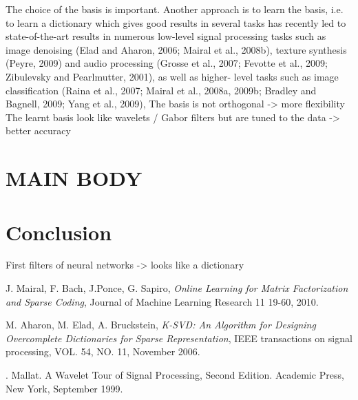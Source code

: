 \documentclass[a4paper,11pt]{article}
\begin{document}
The choice of the basis is important.
Another approach is to learn the basis, i.e. to learn a dictionary which gives good results in several tasks has
recently led to state-of-the-art
results in numerous low-level signal processing tasks such as image denoising (Elad and Aharon,
2006; Mairal et al., 2008b), texture synthesis (Peyre, 2009) and audio processing (Grosse et al.,
2007; Fevotte et al., 2009; Zibulevsky and Pearlmutter, 2001), as well as higher- level tasks such as
image classification (Raina et al., 2007; Mairal et al., 2008a, 2009b; Bradley and Bagnell, 2009;
Yang et al., 2009),
The basis is not orthogonal -> more flexibility
The learnt basis look like wavelets / Gabor filters but are tuned to the data -> better accuracy

\section{MAIN BODY}

\section{Conclusion}
First filters of neural networks -> looks like a dictionary



\begin{thebibliography}{9}
  J. Mairal, F. Bach, J.Ponce, G. Sapiro,
  \emph{Online Learning for Matrix Factorization and Sparse Coding},
  Journal of Machine Learning Research 11 19-60, 2010.

  M. Aharon, M. Elad, A. Bruckstein,
  \emph{K-SVD: An Algorithm for Designing Overcomplete Dictionaries for Sparse Representation},
  IEEE transactions on signal processing, VOL. 54, NO. 11, November 2006.

. Mallat. A Wavelet Tour of Signal Processing, Second Edition. Academic Press, New York,
September 1999.
\end{thebibliography}
\end{document}
